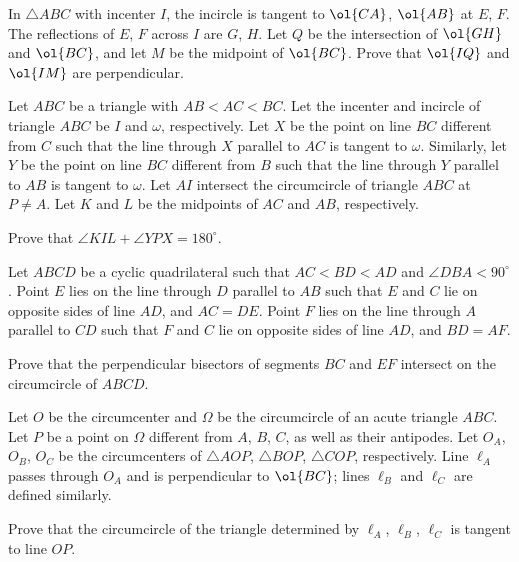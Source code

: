 \documentclass[11pt]{scrartcl}
\begin{document}
\begin{problem}
	In $\triangle ABC$ with incenter $I$,
	the incircle is tangent to $\ol{CA}$, $\ol{AB}$ at $E$, $F$.
	The reflections of $E$, $F$ across $I$ are $G$, $H$.
	Let $Q$ be the intersection of $\ol{GH}$ and $\ol{BC}$,
	and let $M$ be the midpoint of $\ol{BC}$.
	Prove that $\ol{IQ}$ and $\ol{IM}$ are perpendicular.
\end{problem}

\begin{problem}[IMO 2024/4]
	Let $ABC$ be a triangle with $AB < AC < BC$. Let the incenter and incircle of triangle $ABC$ be $I$ and $\omega$, respectively. Let $X$ be the point on line $BC$ different from $C$ such that the line through $X$ parallel to $AC$ is tangent to $\omega$. Similarly, let $Y$ be the point on line $BC$ different from $B$ such that the line through $Y$ parallel to $AB$ is tangent to $\omega$. Let $AI$ intersect the circumcircle of triangle $ABC$ at $P \ne A$. Let $K$ and $L$ be the midpoints of $AC$ and $AB$, respectively.

	Prove that $\angle KIL + \angle YPX = 180^\circ$.
\end{problem}

\begin{problem}[ISL 2024 G1]
	Let $ABCD$ be a cyclic quadrilateral such that $AC < BD < AD$ and $\angle DBA < 90^\circ$. Point $E$ lies on the line through $D$ parallel to $AB$ such that $E$ and $C$ lie on opposite sides of line $AD$, and $AC = DE$. Point $F$ lies on the line through $A$ parallel to $CD$ such that $F$ and $C$ lie on opposite sides of line $AD$, and $BD = AF$.

	Prove that the perpendicular bisectors of segments $BC$ and $EF$ intersect on the circumcircle of $ABCD$.
\end{problem}

\begin{problem}[ISL 2018 G7]
	Let $O$ be the circumcenter and $\Omega$ be the circumcircle
	of an acute triangle $ABC$.
	Let $P$ be a point on $\Omega$ different from $A$, $B$, $C$,
	as well as their antipodes.
	Let $O_A$, $O_B$, $O_C$ be the circumcenters of $\triangle AOP$, $\triangle BOP$, $\triangle COP$, respectively.
	Line $\ell_A$ passes through $O_A$ and is perpendicular to $\ol{BC}$;
	lines $\ell_B$ and $\ell_C$ are defined similarly.

	Prove that the circumcircle of the triangle determined by $\ell_A$, $\ell_B$, $\ell_C$
	is tangent to line $OP$.
\end{problem}
\end{document}
